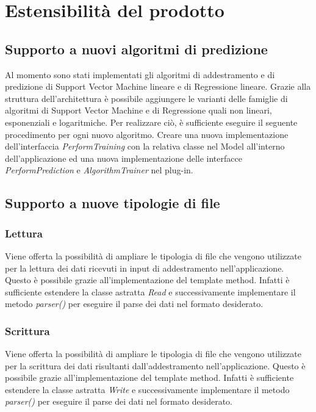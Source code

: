 \section{Estensibilità del prodotto}
	\subsection{Supporto a nuovi algoritmi di predizione}
	Al momento sono stati implementati gli algoritmi di addestramento e di predizione di Support Vector Machine lineare e di Regressione lineare. Grazie alla struttura dell'architettura è possibile aggiungere le varianti delle famiglie di algoritmi di Support Vector Machine e di Regressione quali non lineari, esponenziali e logaritmiche.
	Per realizzare ciò, è sufficiente eseguire il seguente procedimento per ogni nuovo algoritmo. Creare una nuova implementazione dell'interfaccia \textit{PerformTraining} con la relativa classe nel Model all'interno dell'applicazione ed una nuova implementazione delle interfacce \textit{PerformPrediction} e \textit{AlgorithmTrainer} nel plug-in.
	\subsection{Supporto a nuove tipologie di file}
		\subsubsection{Lettura}
		Viene offerta la possibilità di ampliare le tipologia di file che vengono utilizzate per la lettura dei dati ricevuti in input di addestramento nell'applicazione. Questo è possibile grazie all'implementazione del template method. Infatti è sufficiente estendere la classe astratta \textit{Read} e successivamente implementare il metodo \textit{parser()} per eseguire il parse dei dati nel formato desiderato.
		\subsubsection{Scrittura}
		Viene offerta la possibilità di ampliare le tipologia di file che vengono utilizzate per la scrittura dei dati risultanti dall'addestramento nell'applicazione. Questo è possibile grazie all'implementazione del template method. Infatti è sufficiente estendere la classe astratta \textit{Write} e successivamente implementare il metodo \textit{parser()} per eseguire il parse dei dati nel formato desiderato.